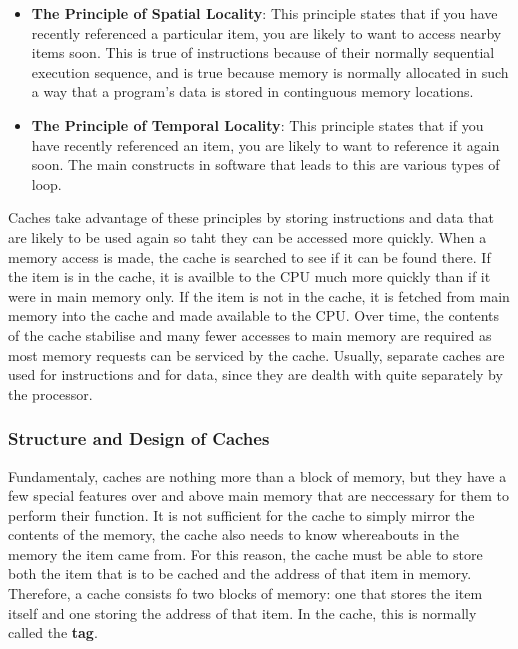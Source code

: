 \documentclass{article}
\begin{document}
	\begin{itemize}
		\item \textbf{The Principle of Spatial Locality}: This principle states that if you have recently referenced a particular item, you are likely to want to access nearby items soon. This is true of instructions because of their normally sequential execution sequence, and is true because memory is normally allocated in such a way that a program's data is stored in continguous memory locations. 
		
		\item \textbf{The Principle of Temporal Locality}: This principle states that if you have recently referenced an item, you are likely to want to reference it again soon. The main constructs in software that leads to this are various types of loop.
	\end{itemize}	
	
	Caches take advantage of these principles by storing instructions and data that are likely to be used again so taht they can be accessed more quickly. When a memory access is made, the cache is searched to see if it can be found there. If the item is in the cache, it is availble to the CPU much more quickly than if it were in main memory only. If the item is not in the cache, it is fetched from main memory into the cache and made available to the CPU. Over time, the contents of the cache stabilise and many fewer accesses to main memory are required as most memory requests can be serviced by the cache. Usually, separate caches are used for instructions and for data, since they are dealth with quite separately by the processor.
	
	\subsubsection{Structure and Design of Caches}
	Fundamentaly, caches are nothing more than a block of memory, but they have a few special features over and above main memory that are neccessary for them to perform their function. It is not sufficient for the cache to simply mirror the contents of the memory, the cache also needs to know whereabouts in the memory the item came from. For this reason, the cache must be able to store both the item that is to be cached and the address of that item in memory. Therefore, a cache consists fo two blocks of memory: one that stores the item itself and one storing the address of that item. In the cache, this is normally called the \textbf{tag}.
	
\end{document}
